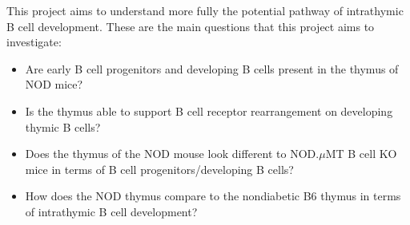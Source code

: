 This project aims to understand more fully the potential pathway of intrathymic B cell development.
These are the main questions that this project aims to investigate:
\begin{itemize}
\item Are early B cell progenitors and developing B cells present in the thymus of NOD mice?
\item Is the thymus able to support B cell receptor rearrangement on developing thymic B cells?
\item Does the thymus of the NOD mouse look different to NOD.$\mu$MT B cell KO mice in terms of B cell progenitors/developing B cells?
\item How does the NOD thymus compare to the nondiabetic B6 thymus in terms of intrathymic B cell development?
\end{itemize}

